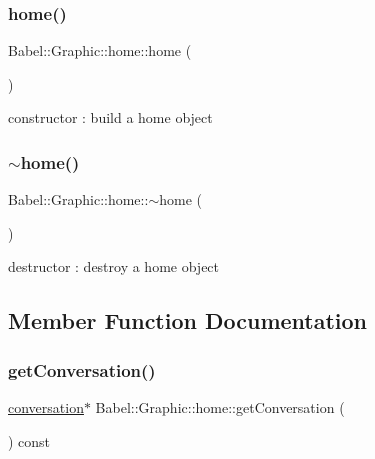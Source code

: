\subsubsection{\texorpdfstring{home()}{home()}}
{\footnotesize\ttfamily Babel\+::\+Graphic\+::home\+::home (\begin{DoxyParamCaption}{ }\end{DoxyParamCaption})}

constructor \+: build a home object \mbox{\label{classBabel_1_1Graphic_1_1home_a31a5fda4e1faf1ad427c339aba1581da}} 
\subsubsection{\texorpdfstring{$\sim$home()}{~home()}}
{\footnotesize\ttfamily Babel\+::\+Graphic\+::home\+::$\sim$home (\begin{DoxyParamCaption}{ }\end{DoxyParamCaption})\hspace{0.3cm}{\ttfamily [default]}}

destructor \+: destroy a home object 

\subsection{Member Function Documentation}
\mbox{\label{classBabel_1_1Graphic_1_1home_a62bd864607f2891746e4ec80f4ae4df6}} 
\subsubsection{\texorpdfstring{get\+Conversation()}{getConversation()}}
{\footnotesize\ttfamily \hyperlink{classBabel_1_1Graphic_1_1conversation}{conversation}$\ast$ Babel\+::\+Graphic\+::home\+::get\+Conversation (\begin{DoxyParamCaption}{ }\end{DoxyParamCaption}) const\hspace{0.3cm}{\ttfamily [inline]}}

